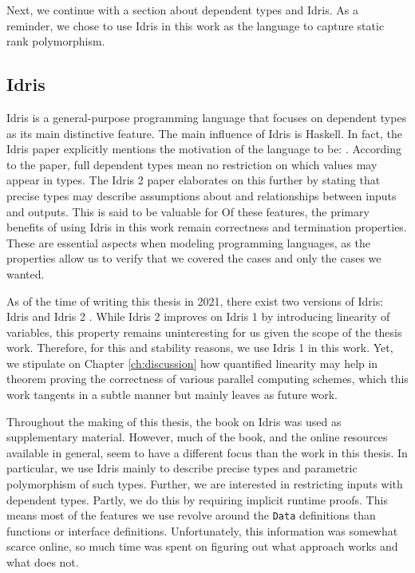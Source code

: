 \documentclass{report}
\begin{document}
Next, we continue with a section about dependent types and Idris. As a reminder, we chose to use Idris in this work as the language to capture static rank polymorphism.

\subsection{Idris}

Idris is a general-purpose programming language that focuses on dependent types as its main distinctive feature. The main influence of Idris is Haskell. In fact, the Idris paper \cite{brady2013idris} explicitly mentions the motivation of the language to be: . According to the paper, full dependent types mean no restriction on which values may appear in types. The Idris 2 paper \cite{brady2021idris} elaborates on this further by stating that precise types may describe assumptions about and relationships between inputs and outputs. This is said to be valuable for  Of these features, the primary benefits of using Idris in this work remain correctness and termination properties. These are essential aspects when modeling programming languages, as the properties allow us to verify that we covered the cases and only the cases we wanted.

As of the time of writing this thesis in 2021, there exist two versions of Idris: Idris \cite{brady2013idris} and Idris 2 \cite{brady2021idris}. While Idris 2 improves on Idris 1 by introducing linearity of variables, this property remains uninteresting for us given the scope of the thesis work. Therefore, for this and stability reasons, we use Idris 1 in this work. Yet, we stipulate on Chapter \ref{ch:discussion} how quantified linearity may help in theorem proving the correctness of various parallel computing schemes, which this work tangents in a subtle manner but mainly leaves as future work.

Throughout the making of this thesis, the book on Idris \cite{brady2017type} was used as supplementary material. However, much of the book, and the online resources available in general, seem to have a different focus than the work in this thesis. In particular, we use Idris mainly to describe precise types and parametric polymorphism of such types. Further, we are interested in restricting inputs with dependent types. Partly, we do this by requiring implicit runtime proofs. This means most of the features we use revolve around the \verb|Data| definitions than functions or interface definitions. Unfortunately, this information was somewhat scarce online, so much time was spent on figuring out what approach works and what does not.
\end{document}
